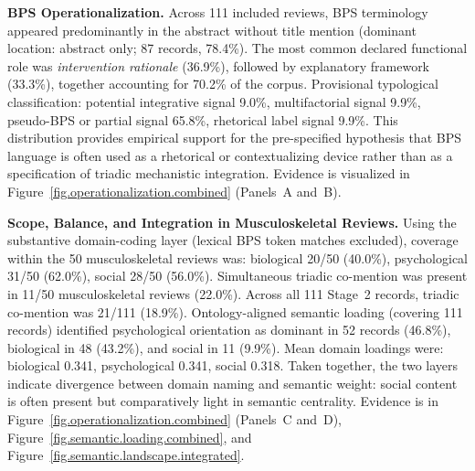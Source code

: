 \noindent\textbf{BPS Operationalization.} Across 111 included reviews, BPS terminology appeared predominantly in the abstract without title mention (dominant location: abstract only; 87 records, 78.4\%). The most common declared functional role was \textit{intervention rationale} (36.9\%), followed by explanatory framework (33.3\%), together accounting for 70.2\% of the corpus. Provisional typological classification: potential integrative signal 9.0\%, multifactorial signal 9.9\%, pseudo-BPS or partial signal 65.8\%, rhetorical label signal 9.9\%. This distribution provides empirical support for the pre-specified hypothesis that BPS language is often used as a rhetorical or contextualizing device rather than as a specification of triadic mechanistic integration. Evidence is visualized in Figure~\ref{fig.operationalization.combined} (Panels~A and~B).

\par\medskip
\noindent\textbf{Scope, Balance, and Integration in Musculoskeletal Reviews.} Using the substantive domain-coding layer (lexical BPS token matches excluded), coverage within the 50 musculoskeletal reviews was: biological 20/50 (40.0\%), psychological 31/50 (62.0\%), social 28/50 (56.0\%). Simultaneous triadic co-mention was present in 11/50 musculoskeletal reviews (22.0\%). Across all 111 Stage~2 records, triadic co-mention was 21/111 (18.9\%). Ontology-aligned semantic loading (covering 111 records) identified psychological orientation as dominant in 52 records (46.8\%), biological in 48 (43.2\%), and social in 11 (9.9\%). Mean domain loadings were: biological 0.341, psychological 0.341, social 0.318. Taken together, the two layers indicate divergence between domain naming and semantic weight: social content is often present but comparatively light in semantic centrality. Evidence is in Figure~\ref{fig.operationalization.combined} (Panels~C and~D), Figure~\ref{fig.semantic.loading.combined}, and Figure~\ref{fig.semantic.landscape.integrated}.

